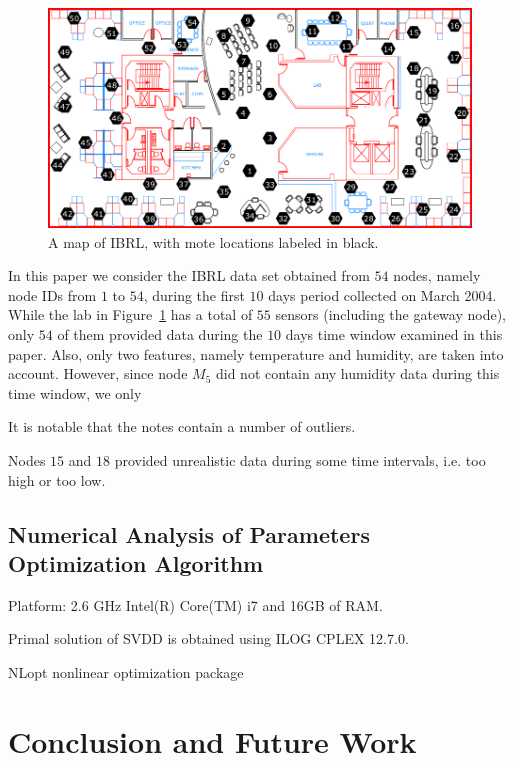 \documentclass[journal,transmag,times]{IEEEtran}
\begin{document}
\begin{figure}[H]
\centering
\includegraphics[scale=.25]{Pictures/ibrl_wsn}
\caption{A map of IBRL, with mote locations labeled in black.}
\label{fig:ibrl_wsn}
\end{figure}

In this paper we consider the IBRL data set obtained from $54$ nodes, namely node IDs from $1$ to $54$, during the first $10$ days period collected on March 2004. While the lab in Figure~\ref{fig:ibrl_wsn} has a total of $55$ sensors (including the gateway node), only $54$ of them provided data during the $10$ days time window examined in this paper. Also, only two features, namely temperature and humidity, are taken into account. However, since node $M_5$ did not contain any humidity data during this time window, we only 

It is notable that the notes contain a number of outliers.

Nodes $15$ and $18$ provided unrealistic data during some time intervals, i.e. too high or too low.

\subsection{Numerical Analysis of Parameters Optimization Algorithm}

Platform: 2.6 GHz Intel(R) Core(TM) i7 and 16GB of RAM.

Primal solution of SVDD is obtained using ILOG CPLEX 12.7.0.

NLopt nonlinear optimization package \cite{nlopt}

\section{Conclusion and Future Work}



\end{document}
